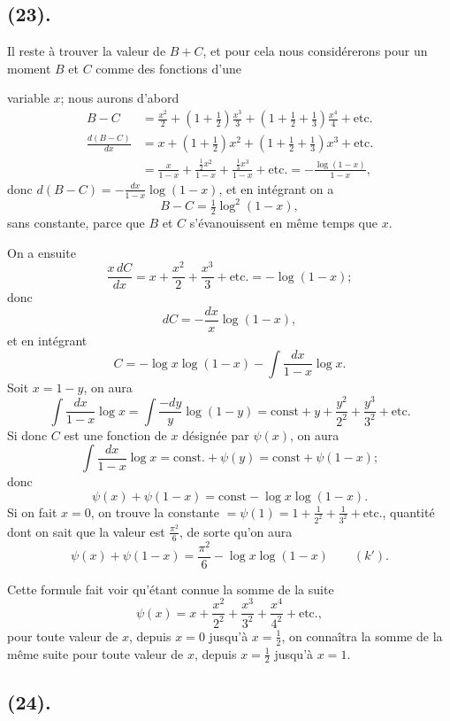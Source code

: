\documentclass{article}
\begin{document}
\subsection*{(23).}

Il reste à trouver la valeur de $B+C$, et pour cela nous considérerons pour un moment $B$ et $C$ comme des fonctions d'une

variable $x$; nous aurons d'abord
\[ \begin{aligned} B-C&=\frac{x^{2}}{2}+\left(1+\tfrac{1}{2}\right)\frac{x^{3}}{3}+\left(1+\tfrac{1}{2}+\tfrac{1}{3}\right)\frac{x^{4}}{4}+\text{etc.}\\ \frac{d(B-C)}{dx}&=x+\left(1+\tfrac{1}{2}\right)x^{2}+\left(1+\tfrac{1}{2}+\tfrac{1}{3}\right)x^{3}+\text{etc.}\\ &=\frac{x}{1-x}+\frac{\frac{1}{2}x^{2}}{1-x}+\frac{\frac{1}{3}x^{3}}{1-x}+\text{etc.}=-\frac{\log(1-x)}{1-x}, \end{aligned} \]
donc $d(B-C)=-\frac{dx}{1-x}\log(1-x)$, et en intégrant on a
\[ B-C=\tfrac{1}{2}\log^{2}(1-x), \]
sans constante, parce que $B$ et $C$ s'évanouissent en même temps que $x$.

On a ensuite
\[ \frac{x\,dC}{dx}=x+\frac{x^{2}}{2}+\frac{x^{3}}{3}+\text{etc.}=-\log(1-x); \]
donc
\[ dC=-\frac{dx}{x}\log(1-x), \]
et en intégrant
\[ C=-\log x\log(1-x)-\int\frac{dx}{1-x}\log x. \]
Soit $x=1-y$, on aura
\[ \int\frac{dx}{1-x}\log x=\int\frac{-dy}{y}\log(1-y)=\text{const}+y+\frac{y^{2}}{2^{2}}+\frac{y^{3}}{3^{2}}+\text{etc.} \]
Si donc $C$ est une fonction de $x$ désignée par $\psi(x)$, on aura
\[ \int\frac{dx}{1-x}\log x=\text{const.}+\psi(y)=\text{const}+\psi(1-x); \]
donc
\[ \psi(x)+\psi(1-x)=\text{const}-\log x\log(1-x). \]
Si on fait $x=0$, on trouve la constante $=\psi(1)=1+\frac{1}{2^{2}}+\frac{1}{3^{2}}+\text{etc.}$, quantité dont on sait que la valeur est $\frac{\pi^{2}}{6}$, de sorte qu'on aura
\[ \psi(x)+\psi(1-x)=\frac{\pi^{2}}{6}-\log x\log(1-x)\qquad(k'). \]

Cette formule fait voir qu'étant connue la somme de la suite
\[ \psi(x)=x+\frac{x^{2}}{2^{2}}+\frac{x^{3}}{3^{2}}+\frac{x^{4}}{4^{2}}+\text{etc.}, \]
pour toute valeur de $x$, depuis $x=0$ jusqu'à $x=\frac{1}{2}$, on connaîtra la somme de la même suite pour toute valeur de $x$, depuis $x=\frac{1}{2}$ jusqu'à $x=1$.

\subsection*{(24).}
\end{document}
